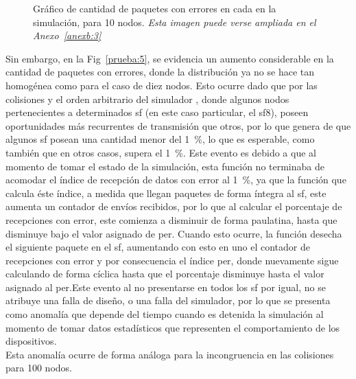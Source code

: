 \begin{justify}
\begin{figure}[!ht]
\caption{Gráfico de cantidad de paquetes con errores en cada  en la simulación, para 10 nodos. \textit{Esta imagen puede verse ampliada en el Anexo~\ref{anexb:3}}}
\label{prueba:4}
\end{figure}
\noindent
Sin embargo, en la Fig~\ref{prueba:5}, se evidencia un aumento considerable en la cantidad de paquetes con errores, donde la distribución ya no se hace tan homogénea como para el caso de diez nodos. Esto ocurre dado que por las colisiones y el orden arbitrario del simulador \OMNET, donde algunos nodos pertenecientes a determinados \gls{sf} (en este caso particular, el \gls{sf}\num{8}), poseen oportunidades más recurrentes de transmisión que otros, por lo que genera de que algunos \gls{sf} posean una cantidad menor del \SI{1}{\percent}, lo que es esperable, como también que en otros casos, supera el \SI{1}{\percent}. Este evento es debido a que al momento de tomar el estado de la simulación, esta función no terminaba de acomodar el índice de recepción de datos con error al \SI{1}{\percent}, ya que la función que calcula éste índice, a medida que llegan paquetes de forma íntegra al \gls{sf}, este aumenta un contador de envíos recibidos, por lo que al calcular el porcentaje de recepciones con error, este comienza a disminuir de forma paulatina, hasta que disminuye bajo el valor asignado de \gls{per}. Cuando esto ocurre, la función desecha el siguiente paquete en el \gls{sf}, aumentando con esto en uno el contador de recepciones con error y por consecuencia el índice \gls{per}, donde nuevamente sigue calculando de forma cíclica hasta que el porcentaje disminuye hasta el valor asignado al \gls{per}.\newpage \noindent Este evento al no presentarse en todos los \gls{sf} por igual, no se atribuye una falla de diseño, o una falla del simulador, por lo que se presenta como anomalía que depende del tiempo cuando es detenida la simulación al momento de tomar datos estadísticos que representen el comportamiento de los dispositivos.\\
Esta anomalía ocurre de forma análoga para la incongruencia en las colisiones para 100 nodos.
\noindent
\begin{figure}[!ht]
\centering

\end{figure}
\end{justify}
